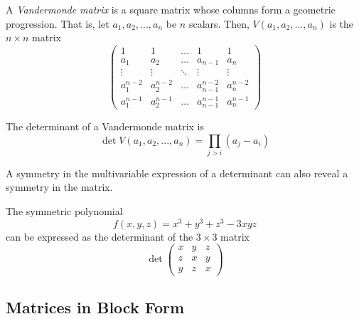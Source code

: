 \documentclass{article}
\begin{document}
  \begin{definition}
  A \textit{Vandermonde matrix} is a square matrix whose columns form a geometric progression. That is, let $a_1, a_2, ..., a_n$ be $n$ scalars. Then, $V(a_1, a_2, ..., a_n)$ is the $n \times n$ matrix
  \[\begin{pmatrix}
  1&1&\ldots&1&1 \\
  a_1&a_2&\ldots&a_{n-1}&a_n\\
  \vdots&\vdots&\ddots&\vdots&\vdots\\
  a_1^{n-2}&a_2^{n-2}&\ldots&a_{n-1}^{n-2}&a_n^{n-2}\\
  a_1^{n-1}&a_2^{n-1}&\ldots&a_{n-1}^{n-1}&a_n^{n-1}
  \end{pmatrix}\]
  \end{definition}

  \begin{theorem}
  The determinant of a Vandermonde matrix is
  \[\det{V(a_1, a_2, ..., a_n)} = \prod_{j>i} (a_j - a_i)\]
  \end{theorem}

  A symmetry in the multivariable expression of a determinant can also reveal a symmetry in the matrix.

  \begin{example}[2019 Putnam A1]
  The symmetric polynomial 
  \[ f(x, y, z) = x^3 + y^3 + z^3 - 3 x y z\]
  can be expressed as the determinant of the $3 \times 3$ matrix
  \[\det{\begin{pmatrix}
  x&y&z\\
  z&x&y\\
  y&z&x
  \end{pmatrix}}\]
  \end{example}

  \subsection{Matrices in Block Form}
\end{document}
